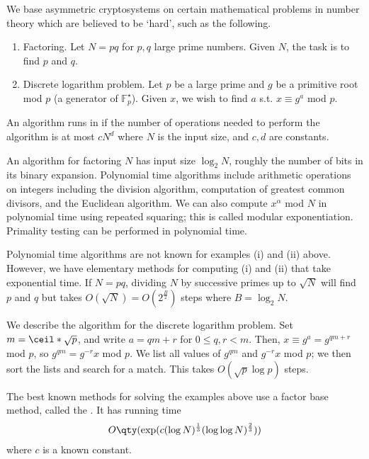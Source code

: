 We base asymmetric cryptosystems on certain mathematical problems in number theory which are believed to be `hard', such as the following.
\begin{enumerate}
    \item Factoring.
    Let $N = pq$ for $p, q$ large prime numbers.
    Given $N$, the task is to find $p$ and $q$.
    \item Discrete logarithm problem.
    Let $p$ be a large prime and $g$ be a primitive root mod $p$ (a generator of $\mathbb F_p^\star$).
    Given $x$, we wish to find $a$ s.t. $x \equiv g^a$ mod $p$.
\end{enumerate}
\begin{definition}
    An algorithm runs in  if the number of operations needed to perform the algorithm is at most $c N^d$ where $N$ is the input size, and $c, d$ are constants.
\end{definition}
\begin{example}
    An algorithm for factoring $N$ has input size $\log_2 N$, roughly the number of bits in its binary expansion.
    Polynomial time algorithms include arithmetic operations on integers including the division algorithm, computation of greatest common divisors, and the Euclidean algorithm.
    We can also compute $x^\alpha$ mod $N$ in polynomial time using repeated squaring; this is called modular exponentiation.
    Primality testing can be performed in polynomial time.

    Polynomial time algorithms are not known for examples (i) and (ii) above.
    However, we have elementary methods for computing (i) and (ii) that take exponential time.
    If $N = pq$, dividing $N$ by successive primes up to $\sqrt{N}$ will find $p$ and $q$ but takes $O(\sqrt{N}) = O(2^{\frac{B}{2}})$ steps where $B = \log_2 N$.

    We describe the  algorithm for the discrete logarithm problem.
    Set $m = \ceil*{\sqrt{p}}$, and write $a = qm + r$ for $0 \leq q, r < m$.
    Then, $x \equiv g^a = g^{qm + r}$ mod $p$, so $g^{qm} = g^{-r} x$ mod $p$.
    We list all values of $g^{qm}$ and $g^{-r}x$ mod $p$; we then sort the lists and search for a match.
    This takes $O(\sqrt{p}\log p)$ steps.

    The best known methods for solving the examples above use a factor base method, called the .
    It has running time
    \begin{align*}
        O\qty(\exp(c (\log N)^{\frac{1}{3}} (\log \log N)^{\frac{2}{3}}))
    \end{align*}
    where $c$ is a known constant.
\end{example}

